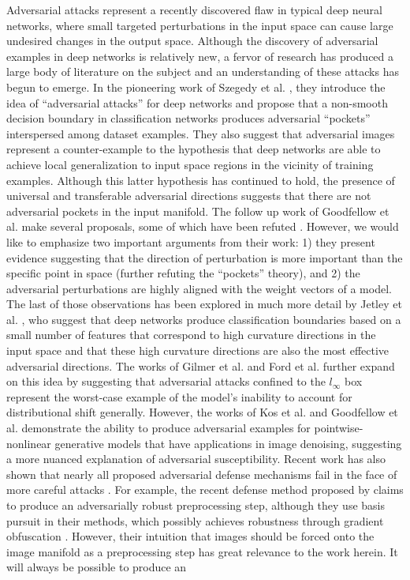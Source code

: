 Adversarial attacks represent a recently discovered flaw in typical deep neural networks, where small targeted perturbations in the input space can cause large undesired changes in the output space. Although the discovery of adversarial examples in deep networks is relatively new, a fervor of research has produced a large body of literature on the subject and an understanding of these attacks has begun to emerge. In the pioneering work of Szegedy et al. \citeyearpar{szegedy2013intriguing}, they introduce the idea of ``adversarial attacks'' for deep networks and propose that a non-smooth decision boundary in classification networks produces adversarial ``pockets'' interspersed among dataset examples. They also suggest that adversarial images represent a counter-example to the hypothesis that deep networks are able to achieve local generalization to input space regions in the vicinity of training examples. Although this latter hypothesis has continued to hold, the presence of universal and transferable adversarial directions \parencite{moosavi2017universal} suggests that there are not adversarial pockets in the input manifold. The follow up work of Goodfellow et al. \citeyearpar{goodfellow2014explaining} make several proposals, some of which have been refuted \parencite{jetley2018friends}. However, we would like to emphasize two important arguments from their work: 1) they present evidence suggesting that the direction of perturbation is more important than the specific point in space (further refuting the ``pockets'' theory), and 2) the adversarial perturbations are highly aligned with the weight vectors of a model. The last of those observations has been explored in much more detail by Jetley et al. \citeyearpar{jetley2018friends}, who suggest that deep networks produce classification boundaries based on a small number of features that correspond to high curvature directions in the input space and that these high curvature directions are also the most effective adversarial directions. The works of Gilmer et al. \citeyearpar{gilmer2018adversarial} and Ford et al. \citeyearpar{ford2019adversarial} further expand on this idea by suggesting that adversarial attacks confined to the $l_{\infty}$ box represent the worst-case example of the model's inability to account for distributional shift generally. However, the works of Kos et al. \citeyearpar{ford2019adversarial} and Goodfellow et al. \citeyearpar{goodfellow2014explaining} demonstrate the ability to produce adversarial examples for pointwise-nonlinear generative models that have applications in image denoising, suggesting a more nuanced explanation of adversarial susceptibility. Recent work has also shown that nearly all proposed adversarial defense mechanisms fail in the face of more careful attacks \parencite{carlini2017towards, athalye2018obfuscated}.  For example, the recent defense method proposed by \parencite{sun2018adversarial} claims to produce an adversarially robust preprocessing step, although they use basis pursuit in their methods, which possibly achieves robustness through gradient obfuscation \parencite{athalye2018obfuscated}. However, their intuition that images should be forced onto the image manifold as a preprocessing step has great relevance to the work herein. It will always be possible to produce an 